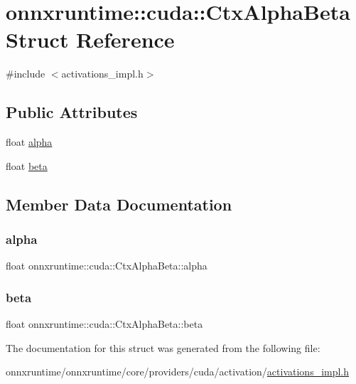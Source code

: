 \hypertarget{structonnxruntime_1_1cuda_1_1CtxAlphaBeta}{}\section{onnxruntime\+:\+:cuda\+:\+:Ctx\+Alpha\+Beta Struct Reference}
\label{structonnxruntime_1_1cuda_1_1CtxAlphaBeta}


{\ttfamily \#include $<$activations\+\_\+impl.\+h$>$}

\subsection*{Public Attributes}
\begin{DoxyCompactItemize}
\item 
float \mbox{\hyperlink{structonnxruntime_1_1cuda_1_1CtxAlphaBeta_ae2ffeaa17833b016057916f0605737c1}{alpha}}
\item 
float \mbox{\hyperlink{structonnxruntime_1_1cuda_1_1CtxAlphaBeta_a765fd1f911ca4b161660d9cc24e62012}{beta}}
\end{DoxyCompactItemize}


\subsection{Member Data Documentation}
\mbox{\label{structonnxruntime_1_1cuda_1_1CtxAlphaBeta_ae2ffeaa17833b016057916f0605737c1}} 
\subsubsection{\texorpdfstring{alpha}{alpha}}
{\footnotesize\ttfamily float onnxruntime\+::cuda\+::\+Ctx\+Alpha\+Beta\+::alpha}

\mbox{\label{structonnxruntime_1_1cuda_1_1CtxAlphaBeta_a765fd1f911ca4b161660d9cc24e62012}} 
\subsubsection{\texorpdfstring{beta}{beta}}
{\footnotesize\ttfamily float onnxruntime\+::cuda\+::\+Ctx\+Alpha\+Beta\+::beta}



The documentation for this struct was generated from the following file\+:\begin{DoxyCompactItemize}
\item 
onnxruntime/onnxruntime/core/providers/cuda/activation/\mbox{\hyperlink{activations__impl_8h}{activations\+\_\+impl.\+h}}\end{DoxyCompactItemize}
